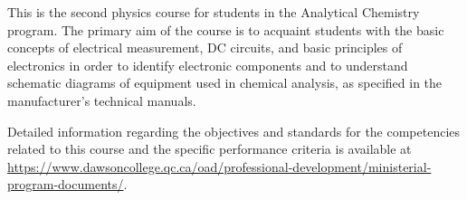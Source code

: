 {This is the second physics course for students in the Analytical Chemistry program. The primary aim of the course is to acquaint students with the basic concepts of electrical measurement, DC circuits, and basic principles of electronics in order to identify electronic components and to understand schematic diagrams of equipment used in chemical analysis, as specified in the manufacturer's technical manuals.
\smallskip


Detailed information regarding the objectives and standards for the competencies related to this course and the specific performance criteria is available at \url{https://www.dawsoncollege.qc.ca/oad/professional-development/ministerial-program-documents/}.}
